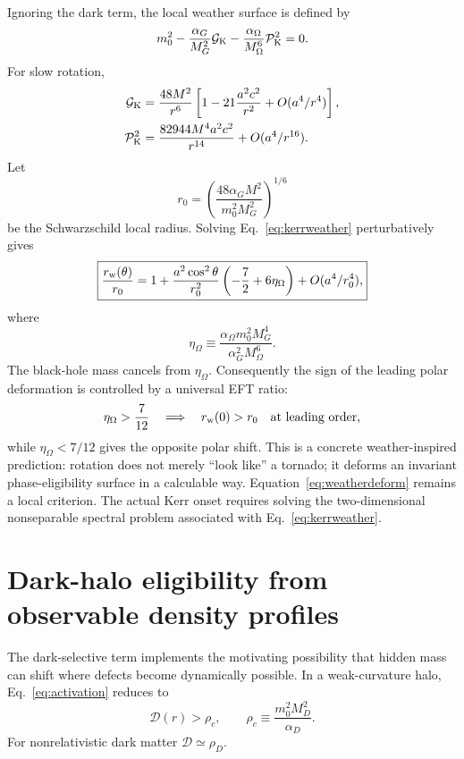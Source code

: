 \documentclass[11pt]{article}
\newcommand{\Geff}{\mathcal G}
\newcommand{\Ddark}{\mathcal D}
\newcommand{\Pontryagin}{\mathcal P}
\begin{document}
Ignoring the dark term, the local weather surface is defined by
\begin{equation}
m_0^2-\frac{\alpha_G}{M_G^2}\Geff_{\rm K}
-\frac{\alpha_\Omega}{M_\Omega^6}\Pontryagin_{\rm K}^2=0.
\label{eq:kerrweather}
\end{equation}
For slow rotation,
\begin{align}
\Geff_{\rm K}&=\frac{48M^2}{r^6}
\left[1-21\frac{a^2c^2}{r^2}+O(a^4/r^4)\right],\\
\Pontryagin_{\rm K}^2&=\frac{82944M^4a^2c^2}{r^{14}}+O(a^4/r^{16}).
\end{align}
Let
\begin{equation}
r_0=\left(\frac{48\alpha_GM^2}{m_0^2M_G^2}\right)^{1/6}
\end{equation}
be the Schwarzschild local radius.  Solving Eq.~\eqref{eq:kerrweather} perturbatively gives
\begin{equation}
\boxed{
\frac{r_{\rm w}(\theta)}{r_0}
=1+\frac{a^2\cos^2\theta}{r_0^2}
\left(-\frac72+6\eta_\Omega\right)
+O(a^4/r_0^4),}
\label{eq:weatherdeform}
\end{equation}
where
\begin{equation}
\boxed{
\eta_\Omega\equiv
\frac{\alpha_\Omega m_0^2M_G^4}{\alpha_G^2M_\Omega^6}.}
\label{eq:etaOmega}
\end{equation}
The black-hole mass cancels from $\eta_\Omega$.  Consequently the sign of the leading polar deformation is controlled by a universal EFT ratio:
\begin{equation}
\eta_\Omega>\frac7{12}
\quad\Longrightarrow\quad
r_{\rm w}(0)>r_0
\quad\text{at leading order},
\label{eq:shapecriterion}
\end{equation}
while $\eta_\Omega<7/12$ gives the opposite polar shift.  This is a concrete weather-inspired prediction: rotation does not merely ``look like'' a tornado; it deforms an invariant phase-eligibility surface in a calculable way.  Equation~\eqref{eq:weatherdeform} remains a local criterion.  The actual Kerr onset requires solving the two-dimensional nonseparable spectral problem associated with Eq.~\eqref{eq:kerrweather}.

\section{Dark-halo eligibility from observable density profiles}

The dark-selective term implements the motivating possibility that hidden mass can shift where defects become dynamically possible.  In a weak-curvature halo, Eq.~\eqref{eq:activation} reduces to
\begin{equation}
\Ddark(r)>\rho_c,
\qquad
\boxed{
\rho_c\equiv\frac{m_0^2M_D^2}{\alpha_D}.
}
\label{eq:rhoc}
\end{equation}
For nonrelativistic dark matter $\Ddark\simeq\rho_D$.
\end{document}

